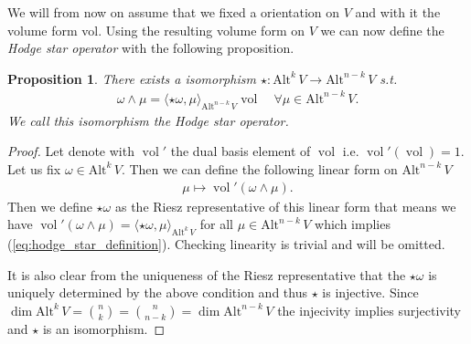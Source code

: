 \documentclass[12pt,a4paper]{article}
\numberwithin{equation}{subsection}
\numberwithin{lemma}{subsection}
\newtheorem{proposition}[lemma]{Proposition}
\theoremstyle{definition}
\DeclareMathOperator{\vol}{vol}
\newcommand{\alternating}[2]{ {\text{Alt}^{#1}\,#2} }
\begin{document}
We will from now on assume that we fixed a orientation on $V$ and with it 
the volume form vol. 
Using the resulting volume form on $V$
we can now define the \textit{Hodge star operator} with the following 
proposition.
\begin{proposition}
    There exists a isomorphism $\star: \alternating{k}{V} 
    \rightarrow \alternating{n-k}{V}$ s.t. 
    \begin{align}
        \omega \wedge \mu = \langle \star \omega, \mu \rangle_{\alternating{n-k}{V}}
        \vol \quad \forall \mu \in \alternating{n-k}{V}.
        \label{eq:hodge_star_definition}            
    \end{align}
    We call this isomorphism the \textit{Hodge star operator}.
\end{proposition}
\begin{proof}
    Let denote with $\vol'$ the dual basis element of $\vol$ i.e.
    $\vol'(\vol) = 1$. Let us fix $\omega \in \alternating{k}{V}$. 
    Then we can define the following linear form on $
    \alternating{n-k}{V}$
    \begin{align*}
        \mu \mapsto \vol' (\omega \wedge \mu).
    \end{align*}
    Then we define
    $\star \omega$ as the Riesz representative of this linear form that means we 
    have $\vol'(\omega \wedge \mu) = 
    \langle \star \omega, \mu \rangle_{\alternating{k}{V}}$ for all 
    $\mu \in \alternating{n-k}{V}$ which implies (\ref{eq:hodge_star_definition}).
    Checking linearity is trivial and will be omitted.

    It is also clear from the uniqueness of the Riesz representative that 
    the $\star\omega$ is uniquely determined by the above condition and 
    thus $\star$ is injective. Since $\dim \alternating{k}{V} = 
    \binom{n}{k} = \binom{n}{n-k} = \dim \alternating{n-k}{V}$ the injecivity 
    implies surjectivity and $\star$ is an isomorphism.
\end{proof}
\end{document}
